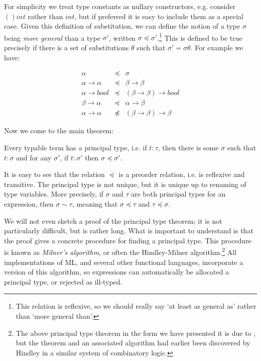 For simplicity we treat type constants as nullary constructors, e.g. consider
$()int$ rather than $int$, but if preferred it is easy to include them as a
special case. Given this definition of substitution, we can define the notion
of a type $\sigma$ being {\em more general} than a type $\sigma'$, written
$\sigma \preceq \sigma'$.\footnote{This relation is reflexive, so we should
really say `at least as general as' rather than `more general than'.} This is
defined to be true precisely if there is a set of substitutions $\theta$ such
that $\sigma' = \sigma \theta$. For example we have:

\begin{eqnarray*}
\alpha          & \preceq & \sigma                      \\
\alpha \to \alpha & \preceq & \beta \to \beta           \\
\alpha \to bool   & \preceq & (\beta \to \beta) \to bool\\
\beta \to \alpha   & \preceq & \alpha \to \beta         \\
\alpha \to \alpha & \not\preceq & (\beta \to \beta) \to \beta
\end{eqnarray*}

\noindent Now we come to the main theorem:

\begin{theorem}
Every typable term has a principal type, i.e. if $t : \tau$, then there is some
$\sigma$ such that $t : \sigma$ and for any $\sigma'$, if $t : \sigma'$ then
$\sigma \preceq \sigma'$.
\end{theorem}

It is easy to see that the relation $\preceq$ is a preorder relation, i.e. is
reflexive and transitive. The principal type is not unique, but it is unique up
to renaming of type variables. More precisely, if $\sigma$ and $\tau$ are both
principal types for an expression, then $\sigma \sim \tau$, meaning that
$\sigma \preceq \tau$ and $\tau \preceq \sigma$.

We will not even sketch a proof of the principal type theorem; it is not
particularly difficult, but is rather long. What is important to understand is
that the proof gives a concrete procedure for finding a principal type. This
procedure is known as {\em Milner's algorithm}, or often the Hindley-Milner
algorithm.\footnote{The above principal type theorem in the form we have
presented it is due to , but the theorem and an associated
algorithm had earlier been discovered by Hindley in a similar system of
combinatory logic.} All implementations of ML, and several other functional
languages, incorporate a version of this algorithm, so expressions can
automatically be allocated a principal type, or rejected as ill-typed.

